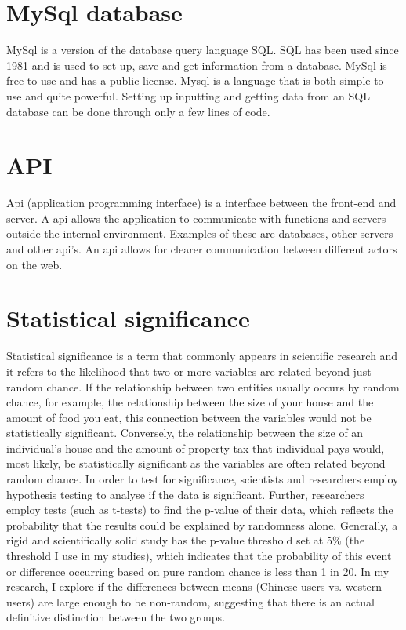 \section{MySql database}
MySql is a version of the database query language SQL. SQL has been used since 1981 and is used to set-up, save and get information from a database. MySql is free to use and has a public license. Mysql is a language that is both simple to use and quite powerful. Setting up inputting and getting data from an SQL database can be done through only a  few lines of code.

\section{API}
Api (application programming interface) is a interface between the front-end and server. A api allows the application to communicate with functions and servers outside the internal environment. Examples of these are databases, other servers and other api's. An api allows for clearer communication between different actors on the web. 

\section{Statistical significance}
Statistical significance is a term that commonly appears in scientific research and it refers to the likelihood that two or more variables are related beyond just random chance. If the relationship between two entities usually occurs by random chance, for example, the relationship between the size of your house and the amount of food you eat, this connection between the variables would not be statistically significant. Conversely, the relationship between the size of an individual's house and the amount of property tax that individual pays would, most likely, be statistically significant as the variables are often related beyond random chance. In order to test for significance, scientists and researchers employ hypothesis testing to analyse if the data is significant. Further, researchers employ tests (such as t-tests) to find the p-value of their data, which reflects the probability that the results could be explained by randomness alone. Generally, a rigid and scientifically solid study has the p-value threshold set at 5\% (the threshold I use in my studies), which indicates that the probability of this event or difference occurring based on pure random chance is less than 1 in 20. In my research, I explore if the differences between means (Chinese users vs. western users) are large enough to be non-random, suggesting that there is an actual definitive distinction between the two groups. \cite{stats}


